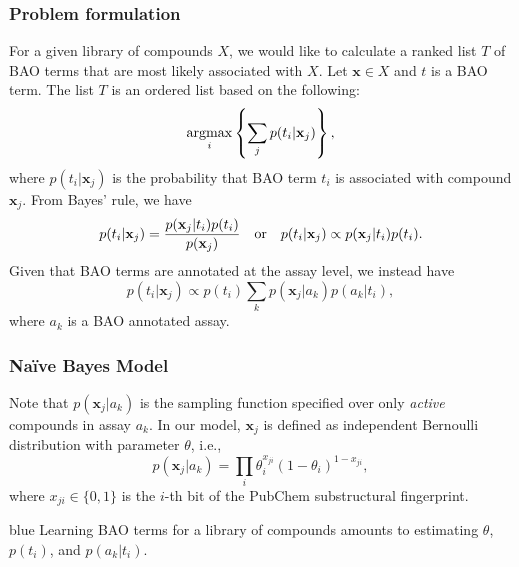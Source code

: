\documentclass[anchorcolor=blue,linkcolor=blue]{beamer}
\newcommand{\argmax}{\operatornamewithlimits{argmax}}
\begin{document}
\begin{frame}
  \frametitle{Problem formulation}
  For a given library of compounds $X$, we would like to calculate a
  ranked list $T$ of BAO terms that are most likely associated with
  $X$. Let $\mathbf{x} \in X$ and $t$ is a BAO term. The list $T$ is
  an ordered list based on the following:
  \begin{equation}
  \argmax_{i}\left\{\sum_jp(t_i|\mathbf{x}_j)\right\},
  \end{equation}
  where $p(t_i|\mathbf{x}_j)$ is the probability that BAO term $t_i$
  is associated with compound $\mathbf{x}_j$. From Bayes' rule, we have
  \[
    p(t_i|\mathbf{x}_j) = \frac{p(\mathbf{x}_j|t_i)p(t_i)}{p(\mathbf{x}_j)}
    \quad\hbox{or} \quad p(t_i|\mathbf{x}_j) \propto p(\mathbf{x}_j|t_i)p(t_i).
  \]
  Given that BAO terms are annotated at the assay level, we instead
  have 
  \begin{equation}
    p(t_i|\mathbf{x}_j) \propto p(t_i)\sum_kp(\mathbf{x}_j|a_k)p(a_k|t_i),
  \end{equation}
  where $a_k$ is a BAO annotated assay.
\end{frame}

\begin{frame}
  \frametitle{Na\"{i}ve Bayes Model}
  Note that $p(\mathbf{x}_j|a_k)$ is the sampling function specified
  over only \emph{active} compounds in assay $a_k$. In our model,
  $\mathbf{x}_j$ is defined as independent Bernoulli distribution with
  parameter $\theta$, i.e., 
\[ p(\mathbf{x}_j|a_k) =
\prod_i\theta_i^{x_{ji}}(1-\theta_i)^{1-x_{ji}},\]
where $x_{ji}\in\{0,1\}$ is the $i$-th bit of the PubChem
substructural fingerprint. 

\begin{block}{}
\begin{color}{blue}
Learning BAO terms for a library of
compounds amounts to estimating $\theta$, $p(t_i)$, and $p(a_k|t_i)$. 
\end{color}
\end{block}
\end{frame}

\end{document}
